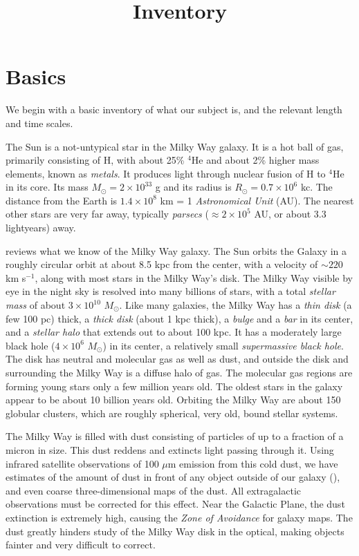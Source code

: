 \title{\bf Inventory}

\section{Basics}

We begin with a basic inventory of what our subject is, and the
relevant length and time scales.

The Sun is a not-untypical star in the Milky Way galaxy. It is a hot
ball of gas, primarily consisting of H, with about 25\% ${}^4$He and
about 2\% higher mass elements, known as {\it metals}. It produces
light through nuclear fusion of H to ${}^4$He in its core. Its mass
$M_\odot = 2\times 10^{33}$ g and its radius is $R_\odot = 0.7 \times
10^6$ kc. The distance from the Earth is $1.4\times 10^8$ km = 1 {\it
  Astronomical Unit} (AU). The nearest other stars are very far away,
typically {\it parsecs} ($\approx 2 \times 10^5$ AU, or about 3.3
lightyears) away.

\citet{blandhawthorn16a} reviews what we know of  the Milky Way galaxy. The Sun
orbits the Galaxy in a roughly circular orbit at about 8.5 kpc from
the center, with a velocity of $\sim 220$ km s$^{-1}$, along with most
stars in the Milky Way's disk. The Milky Way visible by eye in the
night sky is resolved into many billions of stars, with a total {\it
stellar mass} of about $3\times 10^{10}$ $M_\odot$. Like many
galaxies, the Milky Way has a {\it thin disk} (a few 100 pc) thick, a
{\it thick disk} (about 1 kpc thick), a {\it bulge} and a {\it bar} in
its center, and a {\it stellar halo} that extends out to about 100
kpc. It has a moderately large black hole ($4\times 10^6$ $M_\odot$)
in its center, a relatively small {\it supermassive black hole}. The
disk has neutral and molecular gas as well as dust, and outside the
disk and surrounding the Milky Way is a diffuse halo of gas. The
molecular gas regions are forming young stars only a few million years
old. The oldest stars in the galaxy appear to be about 10 billion
years old. Orbiting the Milky Way are about 150 globular clusters,
which are roughly spherical, very old, bound stellar systems.

The Milky Way is filled with dust consisting of particles of up to a
fraction of a micron in size. This dust reddens and extincts light
passing through it. Using infrared satellite observations of 100
$\mu$m emission from this cold dust, we have estimates of the amount
of dust in front of any object outside of our galaxy
(\citealt{schlegel98a}), and even coarse three-dimensional maps of the
dust. All extragalactic observations must be corrected for this
effect. Near the Galactic Plane, the dust extinction is extremely
high, causing the {\it Zone of Avoidance} for galaxy maps. The dust
greatly hinders study of the Milky Way disk in the optical, making
objects fainter and very difficult to correct.


